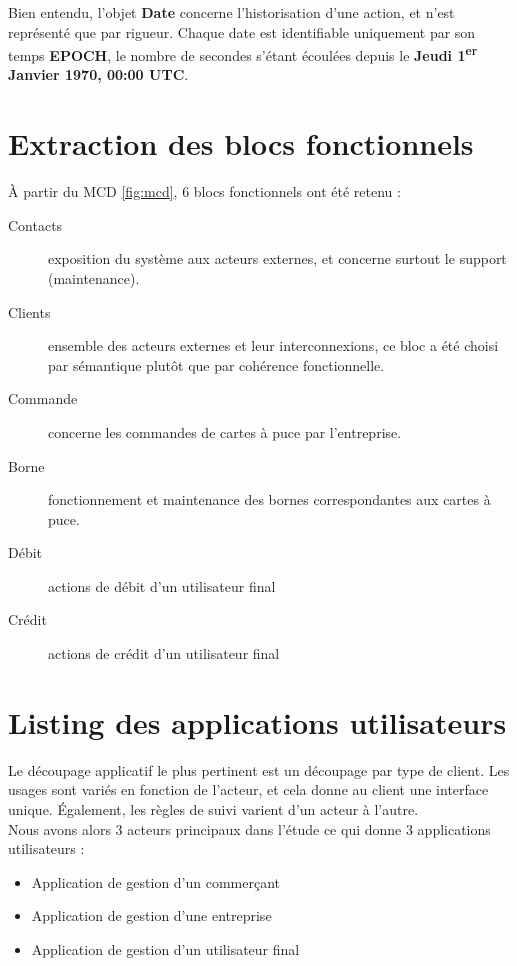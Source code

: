Bien entendu, l'objet \textbf{Date} concerne l'historisation d'une action, et
n'est représenté que par rigueur. Chaque date est identifiable uniquement par
son temps \textbf{EPOCH}, le nombre de secondes s'étant écoulées depuis le
\textbf{Jeudi 1\textsuperscript{er} Janvier 1970, 00:00 UTC}.

\section{Extraction des blocs fonctionnels}

À partir du MCD \ref{fig:mcd}, 6 blocs fonctionnels ont été retenu :

\begin{description}
  \item[Contacts] exposition du système aux acteurs externes, et concerne
    surtout le support (maintenance).
  \item[Clients] ensemble des acteurs externes et leur interconnexions, ce bloc
    a été choisi par sémantique plutôt que par cohérence fonctionnelle.
  \item[Commande] concerne les commandes de cartes à puce par l'entreprise.
  \item[Borne] fonctionnement et maintenance des bornes correspondantes aux
    cartes à puce.
  \item[Débit] actions de débit d'un utilisateur final
  \item[Crédit] actions de crédit d'un utilisateur final
\end{description}


\section{Listing des applications utilisateurs}

Le découpage applicatif le plus pertinent est un découpage par type de client.
Les usages sont variés en fonction de l'acteur, et cela donne au client une
interface unique. Également, les règles de suivi varient d'un acteur à
l'autre.\\

Nous avons alors 3 acteurs principaux dans l'étude ce qui donne 3 applications
utilisateurs : \\
\begin{itemize}
  \item Application de gestion d'un commerçant
  \item Application de gestion d'une entreprise
  \item Application de gestion d'un utilisateur final
\end{itemize}
~\\

